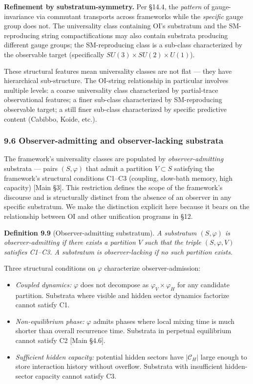 \documentclass[
]{article}
\providecommand{\tightlist}{%
  \setlength{\itemsep}{0pt}\setlength{\parskip}{0pt}}
\begin{document}
\textbf{Refinement by substratum-symmetry.} Per §14.4, the
\emph{pattern} of gauge-invariance via commutant transports across
frameworks while the \emph{specific} gauge group does not. The
universality class containing OI's substratum and the SM-reproducing
string compactifications may also contain substrata producing different
gauge groups; the SM-reproducing class is a sub-class characterized by
the observable target (specifically \(SU(3) \times SU(2) \times U(1)\)).

These structural features mean universality classes are not flat ---
they have hierarchical sub-structure. The OI-string relationship in
particular involves multiple levels: a coarse universality class
characterized by partial-trace observational features; a finer sub-class
characterized by SM-reproducing observable target; a still finer
sub-class characterized by specific predictive content (Cabibbo, Koide,
etc.).

\hypertarget{observer-admitting-and-observer-lacking-substrata}{%
\subsubsection{9.6 Observer-admitting and observer-lacking
substrata}\label{observer-admitting-and-observer-lacking-substrata}}

The framework's universality classes are populated by
\emph{observer-admitting} substrata --- pairs \((S, \varphi)\) that
admit a partition \(V \subset S\) satisfying the framework's structural
conditions C1--C3 (coupling, slow-bath memory, high capacity) {[}Main
§3{]}. This restriction defines the scope of the framework's discourse
and is structurally distinct from the absence of an observer in any
specific substratum. We make the distinction explicit here because it
bears on the relationship between OI and other unification programs in
§12.

\textbf{Definition 9.9} (Observer-admitting substratum). \emph{A
substratum \((S, \varphi)\) is observer-admitting if there exists a
partition \(V\) such that the triple \((S, \varphi, V)\) satisfies
C1--C3. A substratum is observer-lacking if no such partition exists.}

Three structural conditions on \(\varphi\) characterize
observer-admission:

\begin{itemize}
\tightlist
\item
  \emph{Coupled dynamics:} \(\varphi\) does not decompose as
  \(\varphi_V \times \varphi_H\) for any candidate partition. Substrata
  where visible and hidden sector dynamics factorize cannot satisfy C1.
\item
  \emph{Non-equilibrium phase:} \(\varphi\) admits phases where local
  mixing time is much shorter than overall recurrence time. Substrata in
  perpetual equilibrium cannot satisfy C2 {[}Main §4.6{]}.
\item
  \emph{Sufficient hidden capacity:} potential hidden sectors have
  \(|\mathcal{C}_H|\) large enough to store interaction history without
  overflow. Substrata with insufficient hidden-sector capacity cannot
  satisfy C3.
\end{itemize}
\end{document}
